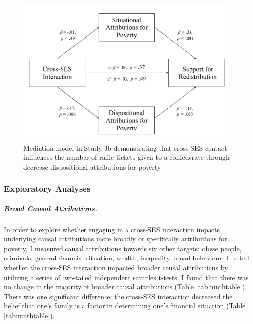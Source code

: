 \documentclass{sfuthesis}
\begin{document}
\begin{figure}
  \begin{center}
    \includegraphics[scale=.75]{Fig4-5.png}
    \caption{Mediation model in Study 3b demonstrating that cross-SES contact influences the number of raffle tickets given to a confederate through decrease dispositional attributions for poverty}
    \label{fig:eleventhfig}
  \end{center}
\end{figure}

\subsubsection{Exploratory Analyses}

\subparagraph{Broad Causal Attributions.} In order to explore whether engaging in a cross-SES interaction impacts underlying causal attributions more broadly or specifically attributions for poverty, I measured causal attributions towards six other targets: obese people, criminals, general financial situation, wealth, inequality, broad behaviour. I tested whether the cross-SES interaction impacted broader causal attributions by utilizing a series of two-tailed independent samples t-tests. I found that there was no change in the majority of broader causal attributions (Table \ref{tab:ninthtable}). There was one significant difference: the cross-SES interaction decreased the belief that one’s family is a factor in determining one’s financial situation (Table \ref{tab:ninthtable}). \newpage
\end{document}
